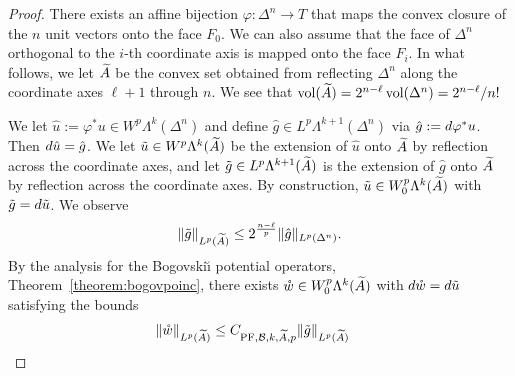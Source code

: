 \documentclass[10pt,a4paper]{article}
\begin{document}
\begin{proof}
    There exists an affine bijection $\varphi : \Delta^n \rightarrow T$ 
    that maps the convex closure of the $n$ unit vectors onto the face $F_0$.
    We can also assume that the face of $\Delta^n$
    orthogonal to the $i$-th coordinate axis is mapped 
    onto the face $F_i$. 
    In what follows, we let $\widetilde {A}$ be the convex set obtained from reflecting $\Delta^n$ along the coordinate axes $\ell+1$ through $n$. 
    We see that $\operatorname{vol}(\widetilde {A}) = 2^{n-\ell} \operatorname{vol}(\Delta^n) = 2^{n-\ell}/n!$
    
    We let $\hat u := \varphi^{\ast} u \in W^{p}\Lambda^{k}(\Delta^n)$ and define $\hat g \in L^{p}\Lambda^{k+1}(\Delta^n)$ via $\hat g := d \varphi^{\ast} u$. 
    Then $d \hat u = \hat g$. 
    We let $\tilde u \in W^{p}\Lambda^{k}(\widetilde {A})$ be the extension of $\hat u$ onto $\widetilde {A}$ by reflection across the coordinate axes,
    and let $\tilde g \in L^{p}\Lambda^{k+1}(\widetilde {A})$ is the extension of $\hat g$ onto $\widetilde {A}$ by reflection across the coordinate axes. 
    By construction, $\tilde u \in W^{p}_{0}\Lambda^{k}(\widetilde {A})$ with $\tilde g = d \tilde u$.
    We observe 
    \begin{align*}
        \| \tilde g \|_{L^{p}(\widetilde {A})}
        \leq 
        2^{\frac {n-\ell} p}
        \| \hat g \|_{L^{p}(\Delta^n)}
        .
    \end{align*}
    By the analysis for the Bogovski\u{\i} potential operators, Theorem~\ref{theorem:bogovpoinc}, 
    there exists $\mathring w \in W^{p}_{0}\Lambda^{k}(\widetilde {A})$
    with $d \mathring w = d \tilde u$ satisfying the bounds 
    \begin{align}\label{math:mixedbconsimplex:exteriorderivative:internalconstant}
        \| \mathring w \|_{L^{p}(\widetilde \Makoto)}
        &\leq 
        C_{{\PF},\Bogov,k,\widetilde \Makoto,p}
        \| \tilde g \|_{L^{p}(\widetilde \Makoto)}

\end{align}
\end{proof}
\end{document}
